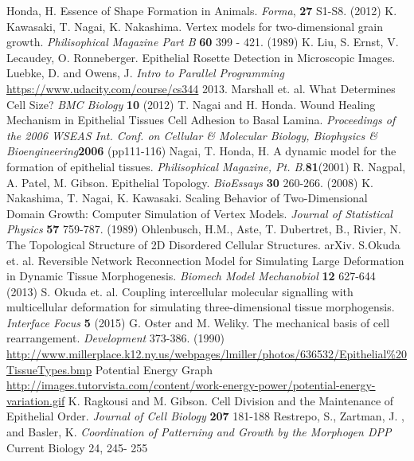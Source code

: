 \begin{thebibliography}{1}
 Honda, H. Essence of Shape Formation in Animals. \emph{Forma}, \textbf{27} S1-S8. (2012)
 K. Kawasaki, T. Nagai, K. Nakashima. Vertex models for two-dimensional grain growth. \emph{Philisophical Magazine Part B} \textbf{60} 399 - 421. (1989)
 K. Liu, S. Ernst, V. Lecaudey, O. Ronneberger. Epithelial Rosette Detection in Microscopic Images.
 Luebke, D. and Owens, J. \emph{Intro to Parallel Programming} \url{https://www.udacity.com/course/cs344} 2013.
 Marshall et. al. What Determines Cell Size? \emph{BMC Biology} \textbf{10} (2012)
 T. Nagai and H. Honda. Wound Healing Mechanism in Epithelial Tissues Cell Adhesion to Basal Lamina. \emph{Proceedings of the 2006 WSEAS Int. Conf. on Cellular \& Molecular Biology, Biophysics \& Bioengineering}\textbf{2006} (pp111-116)
 Nagai, T. Honda, H. A dynamic model for the formation of epithelial tissues. \emph{Philisophical Magazine, Pt. B.}\textbf{81}(2001) 
 R. Nagpal, A. Patel, M. Gibson. Epithelial Topology. \emph{BioEssays} \textbf{30} 260-266. (2008)
 K. Nakashima, T. Nagai, K. Kawasaki. Scaling Behavior of Two-Dimensional  Domain Growth: Computer Simulation of Vertex Models. \emph{Journal of Statistical Physics} \textbf{57} 759-787. (1989)
 Ohlenbusch, H.M., Aste, T. Dubertret, B., Rivier, N. The Topological Structure of 2D Disordered Cellular Structures. arXiv.
 S.Okuda et. al. Reversible Network Reconnection Model for Simulating Large Deformation in Dynamic Tissue Morphogenesis. \emph{Biomech Model Mechanobiol} \textbf{12} 627-644 (2013)
 S. Okuda et. al. Coupling intercellular molecular signalling with multicellular deformation for simulating three-dimensional tissue morphogensis. \emph{Interface Focus} \textbf{5} (2015)
G. Oster and M. Weliky. The mechanical basis of cell rearrangement. \emph{Development}  373-386. (1990)
 \url{http://www.millerplace.k12.ny.us/webpages/lmiller/photos/636532/Epithelial\%20TissueTypes.bmp}
 Potential Energy Graph \url{http://images.tutorvista.com/content/work-energy-power/potential-energy-variation.gif}
 K. Ragkousi and M. Gibson. Cell Division and the Maintenance of Epithelial Order. \emph{Journal of Cell Biology} \textbf{207} 181-188
 Restrepo, S., Zartman, J. , and Basler, K. \emph{ Coordination of Patterning and Growth by the Morphogen DPP} Current Biology 24, 245- 255

\end{thebibliography}
